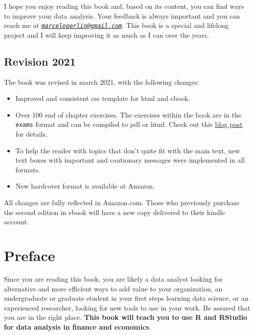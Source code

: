 \documentclass[
  12pt,
]{book}
\providecommand{\tightlist}{%
  \setlength{\itemsep}{0pt}\setlength{\parskip}{0pt}}
\begin{document}
I hope you enjoy reading this book and, based on its content, you can find ways to improve your data analysis. Your feedback is always important and you can reach me at \emph{\href{mailto:marceloperlin@gmail.com}{\nolinkurl{marceloperlin@gmail.com}}}. This book is a special and lifelong project and I will keep improving it as much as I can over the years.

\hypertarget{revision-2021}{%
\section*{Revision 2021}\label{revision-2021}}

The book was revised in march 2021, with the following changes:

\begin{itemize}
\tightlist
\item
  Improved and consistent css template for html and ebook.
\item
  Over 100 end of chapter exercises. The exercises within the book are in the \texttt{exams} \citep{R-exams} format and can be compiled to pdf or html. Check out this \href{https://www.msperlin.com/blog/post/2021-02-28-dynamic-exercises-afedr/}{blog post} for details.
\item
  To help the reader with topics that don't quite fit with the main text, new text boxes with important and cautionary messages were implemented in all formats.
\item
  New hardcover format is available at Amazon.
\end{itemize}

All changes are fully reflected in Amazon.com. Those who previously purchase the second edition in ebook will have a new copy delivered to their kindle account.

\hypertarget{preface}{%
\chapter*{Preface}\label{preface}}

Since you are reading this book, you are likely a data analyst looking for alternative and more efficient ways to add value to your organization, an undergraduate or graduate student in your first steps learning data science, or an experienced researcher, looking for new tools to use in your work. Be assured that you are in the right place. \textbf{This book will teach you to use R and RStudio for data analysis in finance and economics}.
\end{document}
